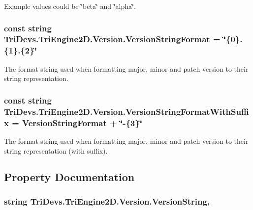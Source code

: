Example values could be \char`\"{}beta\char`\"{} and \char`\"{}alpha\char`\"{}. \hypertarget{class_tri_devs_1_1_tri_engine2_d_1_1_version_a7ff4d8681e4833ef71067425aac665e4}{
\subsubsection[{Version\-String\-Format}]{\setlength{\rightskip}{0pt plus 5cm}const string Tri\-Devs.\-Tri\-Engine2\-D.\-Version.\-Version\-String\-Format = \char`\"{}\{0\}.\{1\}.\{2\}\char`\"{}}}\label{class_tri_devs_1_1_tri_engine2_d_1_1_version_a7ff4d8681e4833ef71067425aac665e4}


The format string used when formatting major, minor and patch version to their string representation. 

\hypertarget{class_tri_devs_1_1_tri_engine2_d_1_1_version_a6cb3be646f1ff0c726266576f5579e92}{
\subsubsection[{Version\-String\-Format\-With\-Suffix}]{\setlength{\rightskip}{0pt plus 5cm}const string Tri\-Devs.\-Tri\-Engine2\-D.\-Version.\-Version\-String\-Format\-With\-Suffix = {\bf Version\-String\-Format} + \char`\"{}-\/\{3\}\char`\"{}}}\label{class_tri_devs_1_1_tri_engine2_d_1_1_version_a6cb3be646f1ff0c726266576f5579e92}


The format string used when formatting major, minor and patch version to their string representation (with suffix). 



\subsection{Property Documentation}
\hypertarget{class_tri_devs_1_1_tri_engine2_d_1_1_version_a489911cfed8c6053787bee8411650073}{
\subsubsection[{Version\-String}]{\setlength{\rightskip}{0pt plus 5cm}string Tri\-Devs.\-Tri\-Engine2\-D.\-Version.\-Version\-String\hspace{0.3cm}{\ttfamily [static]}, {\ttfamily [get]}}}\label{class_tri_devs_1_1_tri_engine2_d_1_1_version_a489911cfed8c6053787bee8411650073}


